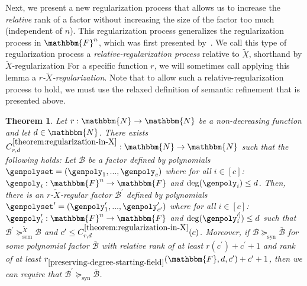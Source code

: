 \documentclass[10pt,a4paper]{article}
\newtheorem{theorem}{Theorem}[section]
\newcommand{\basefield}[0]{\mathbbm{F}}
\newcommand{\blocklength}[0]{n}
\newcommand{\field}[0]{\basefield^{\blocklength}}
\newcommand{\degree}[0]{d}
\newcommand{\funcdef}[3]{#1:#2\rightarrow#3}
\newcommand{\factor}[0]{\mathcal{B}}
\newcommand{\relsemrefineex}[1]{\succeq^{#1}_{\text{sem}}}
\newcommand{\synrefine}[0]{\succeq_{\text{syn}}}
\newcommand{\naturalnumbersset}[0]{\mathbbm{N}}
\newcommand{\variety}{{\tilde{X}}}
\newcommand{\rankfunc}[0]{{{{r}}}}
\begin{document}
Next, we present a new regularization process that allows us to increase the \emph{relative} rank of a factor without increasing the size of the factor too much (independent of $\blocklength$).
This regularization process generalizes the regularization process in $\field$, which was first presented by~\cite[2.3]{green2007distribution}.
We call this type of regularization process a \emph{relative-regularization process} relative to $\variety$, shorthand by $\variety$-regularization
For a specific function $\rankfunc$, we will sometimes call applying this lemma a \emph{$\rankfunc$-$\variety$-regularization}.
Note that to allow such a relative-regularization process to hold, we must use the relaxed definition of semantic refinement that is presented above.
\begin{theorem}\label{theorem:regularization-in-X}
    Let $\funcdef{\rankfunc}{\naturalnumbersset}{\naturalnumbersset}$ be a non-decreasing function and let $\degree \in \naturalnumbersset$.
    There exists $\funcdef{C_{\rankfunc, \degree}^{\ref{theorem:regularization-in-X}}}{\naturalnumbersset}{\naturalnumbersset}$ such that the following holds:
    Let $\factor$ be a factor defined by polynomials $\genpolyset = (\genpoly_1,...,\genpoly_c)$ where for all $i \in [c]$: $\funcdef{\genpoly_i}{\field}{\basefield}$ and $\deg(\genpoly_i) \leq \degree$.
    Then, there is an $\rankfunc$-$\variety$-regular factor $\factor^\prime$ defined by polynomials $\genpolyset^{\prime} = (\genpoly^{\prime}_{1},...,\genpoly^{\prime}_{c^\prime})$ where
    for all $i \in [c]$: $\funcdef{\genpoly^{\prime}_i}{\field}{\basefield}$ and $\deg(\genpoly^{\prime]}_{i}) \leq \degree$ such that
    $\factor^\prime \relsemrefineex{\variety} \factor$ and $c^\prime \leq C_{\rankfunc, \degree}^{\ref{theorem:regularization-in-X}}(c)$.
    \newline
    Moreover, if $\factor \synrefine \bar{\factor}$ for some polynomial factor $\bar{\factor}$ with
    relative rank of at least $\rankfunc(c^\prime)+c^\prime+1$ and rank of at least ${\rankfunc_{\ref{preserving-degree-starting-field}}(\basefield, \degree, c^{\prime})} + c^\prime + 1$,
    then we can require that $\factor^\prime \synrefine \bar{\factor}$.
\end{theorem}
\end{document}

